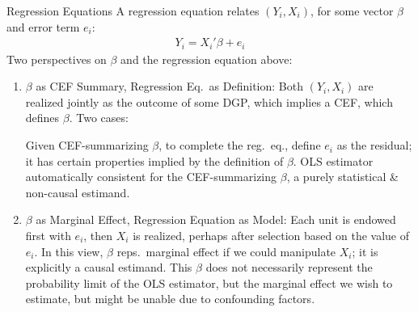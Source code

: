 \documentclass[aspectratio=169, handout]{beamer}
\begin{document}
{\scriptsize
\begin{frame}{Regression Equations}
A \alert{regression equation} relates $(Y_i,X_i)$, for
some vector $\beta$ and error term $e_i$:
\begin{align*}
  Y_i = X_i'\beta + e_i
\end{align*}
Two perspectives on $\beta$ and the regression equation above:
\vspace{-5pt}
\begin{enumerate}
  \item
    \alert{$\beta$ as CEF Summary, Regression Eq.\ as Definition}:
    Both $(Y_i,X_i)$ are realized jointly as the outcome of some DGP,
    which implies a CEF, which defines $\beta$.
    Two cases:
    Given CEF-summarizing $\beta$, to complete the reg.\ eq.,
    \alert{define} $e_i$ as the residual; it has certain
    properties implied by the definition of $\beta$.
    OLS estimator automatically consistent for the
    CEF-summarizing $\beta$, a purely statistical \& \alert{non-causal}
    estimand.

  \item
    \alert{$\beta$ as Marginal Effect, Regression Equation as Model}:
    Each unit is endowed first with $e_i$, then $X_i$ is
    realized, perhaps after selection based on the value of
    $e_i$.
    In this view, $\beta$ reps.\ marginal effect if we could
    \alert{manipulate} $X_i$; it is explicitly a \alert{causal}
    estimand.
    This $\beta$ does not necessarily represent the probability limit of
    the OLS estimator, but the marginal effect we \alert{wish} to
    estimate, but might be unable due to confounding factors.
\end{enumerate}
\end{frame}
}
\end{document}
